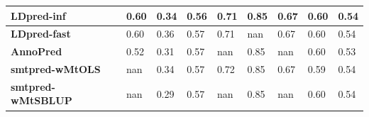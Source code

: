 \documentclass[pdflatex,sn-nature]{sn-jnl}%
\begin{document}
\begin{table}[!ht]
{\begin{tabular}{|l|l|l|l|l|l|l|l|l|}
\textbf{LDpred-inf}    \cite{Reales_2021}      & \cellcolor[HTML]{63BE7B}0.60 & \cellcolor[HTML]{9ACE7F}0.34 & \cellcolor[HTML]{FCB77A}0.56 & \cellcolor[HTML]{E2E383}0.71                                                     & \cellcolor[HTML]{FEE683}0.85                                         & \cellcolor[HTML]{67C07C}0.67                                                 & \cellcolor[HTML]{FAEA84}0.60                                                    & \cellcolor[HTML]{FEE983}0.54 \\ \hline
\textbf{LDpred-fast}    \cite{Reales_2021}     & \cellcolor[HTML]{63BE7B}0.60 & \cellcolor[HTML]{87C97E}0.36 & \cellcolor[HTML]{FCBE7B}0.57 & \cellcolor[HTML]{E3E383}0.71                                                     & nan                                                                  & \cellcolor[HTML]{67BF7C}0.67                                                 & \cellcolor[HTML]{F9E984}0.60                                                    & \cellcolor[HTML]{FFEB84}0.54 \\ \hline
\textbf{AnnoPred}     \cite{Hu_2017}      & \cellcolor[HTML]{FDC87D}0.52 & \cellcolor[HTML]{B5D680}0.31 & \cellcolor[HTML]{FCB87A}0.57 & nan                                                                              & \cellcolor[HTML]{FEE583}0.85                                         & nan                                                                          & \cellcolor[HTML]{F0E784}0.60                                                    & \cellcolor[HTML]{FBAD78}0.53 \\ \hline
\textbf{smtpred-wMtOLS}  \cite{Maier_2018}    & nan                          & \cellcolor[HTML]{9BCF7F}0.34 & \cellcolor[HTML]{FDCE7E}0.57 & \cellcolor[HTML]{C6DB81}0.72                                                     & \cellcolor[HTML]{FEE683}0.85                                         & \cellcolor[HTML]{64BF7C}0.67                                                 & \cellcolor[HTML]{FEEB84}0.59                                                    & \cellcolor[HTML]{FEE983}0.54 \\ \hline
\textbf{smtpred-wMtSBLUP}  \cite{Maier_2018}  & nan                          & \cellcolor[HTML]{CCDD82}0.29 & \cellcolor[HTML]{FDCE7E}0.57 & nan                                                                              & \cellcolor[HTML]{FEE683}0.85                                         & nan                                                                          & \cellcolor[HTML]{F5E884}0.60                                                    & \cellcolor[HTML]{FEEA83}0.54 \\ \hline

\end{tabular}}
\end{table}
\end{document}
